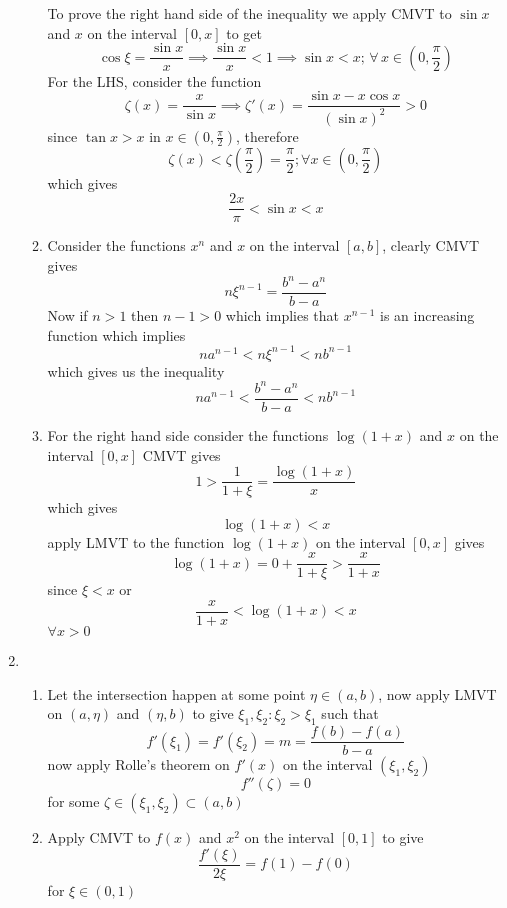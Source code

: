 \documentclass[12pt]{article}
\begin{document}
\begin{enumerate}
\begin{enumerate}
				To prove the right hand side of the inequality we apply CMVT to $\sin x$ and $x$ on the interval $[0,x]$ to get
				$$
				\cos \xi = \frac{\sin x}{x} \implies \frac{\sin x}{x}<1 \implies \sin x < x;\, \forall\, x \in\left( 0, \frac{\pi}{2} \right)
				$$
				For the LHS, consider the function
				$$
				\zeta(x) = \frac{x}{\sin x} \implies \zeta'(x) = \frac{\sin x -x\cos x}{(\sin x)^{2}} > 0
				$$
				since $\tan x > x$ in $x \in\left( 0, \frac{\pi}{2} \right)$, therefore
				$$
				\zeta(x) < \zeta\left( \frac{\pi}{2} \right) = \frac{\pi}{2}; \forall x \in \left( 0, \frac{\pi}{2} \right)
				$$
				which gives
				$$
				\boxed{
					\frac{2x}{\pi} < \sin x < x
				}
				$$
			\item
				Consider the functions $x^n$ and $x$ on the interval $[a,b]$, clearly CMVT gives
				$$
				n\xi^{n-1} = \frac{b^{n}-a^{n}}{b-a}
				$$Now if $n>1$ then $n-1>0$ which implies that $x^{n-1}$ is an increasing function which implies
				$$
				na^{n-1}< n\xi^{n-1} < nb^{n-1}
				$$
				which gives us the inequality
				$$
				\boxed{
					na^{n-1} < \frac{b^{n} - a^{n}}{b-a} < nb^{n-1}
				}
				$$
			\item
				For the right hand side consider the functions $\log(1+x)$ and $x$ on the interval $[0,x]$ CMVT gives
				$$
				1>\frac{1}{1+ \xi} =\frac{\log(1+x)}{x}
				$$
				which gives 
				$$
				\log(1+x)< x
				$$
				apply LMVT to the function $\log(1+x)$ on the interval $[0,x]$ gives
				$$
				\log(1+x) = 0 + \frac{x}{1 + \xi} > \frac{x}{1+x}
				$$since $\xi < x$ or
				$$
				\boxed{
					\frac{x}{1+x}<\log(1+x)<x
				}
				$$
				$\forall x>0$

		\end{enumerate}
		\item
			\begin{enumerate}
				
				\item
					Let the intersection happen at some point $\eta \in (a,b)$, now apply LMVT on $(a,\eta)$ and $(\eta, b)$ to give $\xi_{1}, \xi_{2}:\xi_{2}>\xi_{1}$ such that
					$$
					f'(\xi_{1})=f'(\xi_{2}) = m = \frac{f(b)-f(a)}{b-a}
					$$
					now apply Rolle's theorem on $f'(x)$ on the interval $(\xi_{1},\xi_{2})$
					$$
					f''(\zeta) = 0
					$$
					for some $\zeta \in (\xi_{1}, \xi_{2}) \subset (a,b)$

				\item
					Apply CMVT to $f(x)$ and $x^{2}$ on the interval $[0,1]$ to give
					$$
					\frac{f'(\xi)}{2\xi} = f(1)-f(0)
					$$
					for $\xi \in(0,1)$


\end{enumerate}
\end{enumerate}
\end{document}
